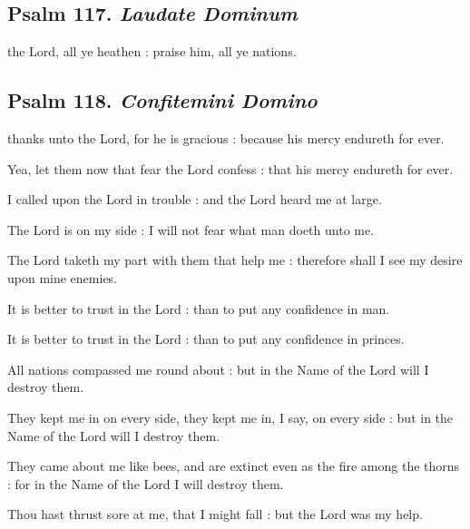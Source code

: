 \subsection{Psalm 117. \textit{Laudate Dominum}}

 the Lord, all ye heathen : praise him, all ye nations.\par
{}

\subsection{Psalm 118. \textit{Confitemini Domino}}

 thanks unto the Lord, for he is gracious : because his mercy endureth for ever.\par
{}
Yea, let them now that fear the Lord confess : that his mercy endureth for ever.\par
{}I called upon the Lord in trouble : and the Lord heard me at large.\par
{}The Lord is on my side : I will not fear what man doeth unto me.\par
{}The Lord taketh my part with them that help me : therefore shall I see my desire upon mine enemies.\par
{}It is better to trust in the Lord : than to put any confidence in man.\par
{}It is better to trust in the Lord : than to put any confidence in princes.\par
{}All nations compassed me round about : but in the Name of the Lord will I destroy them.\par
{}They kept me in on every side, they kept me in, I say, on every side : but in the Name of the Lord will I destroy them.\par
{}They came about me like bees, and are extinct even as the fire among the thorns : for in the Name of the Lord I will destroy them.\par
{}Thou hast thrust sore at me, that I might fall : but the Lord was my help.\par

